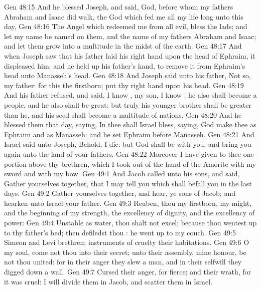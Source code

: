 \vs Gen 48:15 And he blessed Joseph, and said, God, before whom my fathers Abraham and Isaac did walk, the God which fed me all my life long unto this day,
\vs Gen 48:16 The Angel which redeemed me from all evil, bless the lads; and let my name be named on them, and the name of my fathers Abraham and Isaac; and let them grow into a multitude in the midst of the earth.
\vs Gen 48:17 And when Joseph saw that his father laid his right hand upon the head of Ephraim, it displeased him: and he held up his father's hand, to remove it from Ephraim's head unto Manasseh's head.
\vs Gen 48:18 And Joseph said unto his father, Not so, my father: for this  the firstborn; put thy right hand upon his head.
\vs Gen 48:19 And his father refused, and said, I know , my son, I know : he also shall become a people, and he also shall be great: but truly his younger brother shall be greater than he, and his seed shall become a multitude of nations.
\vs Gen 48:20 And he blessed them that day, saying, In thee shall Israel bless, saying, God make thee as Ephraim and as Manasseh: and he set Ephraim before Manasseh.
\vs Gen 48:21 And Israel said unto Joseph, Behold, I die: but God shall be with you, and bring you again unto the land of your fathers.
\vs Gen 48:22 Moreover I have given to thee one portion above thy brethren, which I took out of the hand of the Amorite with my sword and with my bow.
\vs Gen 49:1 And Jacob called unto his sons, and said, Gather yourselves together, that I may tell you  which shall befall you in the last days.
\vs Gen 49:2 Gather yourselves together, and hear, ye sons of Jacob; and hearken unto Israel your father.
\vs Gen 49:3 Reuben, thou  my firstborn, my might, and the beginning of my strength, the excellency of dignity, and the excellency of power:
\vs Gen 49:4 Unstable as water, thou shalt not excel; because thou wentest up to thy father's bed; then defiledst thou : he went up to my couch.
\vs Gen 49:5 Simeon and Levi  brethren; instruments of cruelty  their habitations.
\vs Gen 49:6 O my soul, come not thou into their secret; unto their assembly, mine honour, be not thou united: for in their anger they slew a man, and in their selfwill they digged down a wall.
\vs Gen 49:7 Cursed  their anger, for  fierce; and their wrath, for it was cruel: I will divide them in Jacob, and scatter them in Israel.
